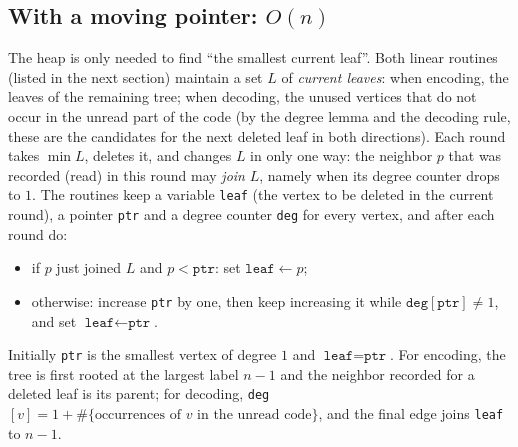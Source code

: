 \documentclass[11pt]{article}
\begin{document}
\subsection{With a moving pointer: \texorpdfstring{$O(n)$}{O(n)}}
The heap is only needed to find ``the smallest current leaf''. Both
linear routines (listed in the next section) maintain a set $L$ of
\emph{current leaves}: when encoding, the leaves of the remaining tree;
when decoding, the unused vertices that do not occur in the unread part of
the code (by the degree lemma and the decoding rule, these are the candidates for
the next deleted leaf in both directions). Each round takes $\min L$, deletes it, and
changes $L$ in only one way: the neighbor $p$ that was recorded (read) in
this round may \emph{join} $L$, namely when its degree counter drops to
$1$. The routines keep a variable \texttt{leaf} (the vertex to be deleted
in the current round), a pointer \texttt{ptr} and a degree counter
\texttt{deg} for every vertex, and after each round do:
\begin{itemize}[leftmargin=1.5em,itemsep=1pt]
  \item if $p$ just joined $L$ and $p<\texttt{ptr}$: set
        $\texttt{leaf}\gets p$;
  \item otherwise: increase \texttt{ptr} by one, then keep increasing it
        while $\texttt{deg}[\texttt{ptr}]\ne1$, and set
        $\texttt{leaf}\gets\texttt{ptr}$.
\end{itemize}
Initially \texttt{ptr} is the smallest vertex of degree $1$ and
$\texttt{leaf}=\texttt{ptr}$. For encoding, the tree is first rooted at
the largest label $n-1$ and the neighbor recorded for a deleted leaf is
its parent; for decoding, \texttt{deg}$[v]=1+\#\{\text{occurrences of }v
\text{ in the unread code}\}$, and the final edge joins \texttt{leaf} to
$n-1$.
\end{document}
